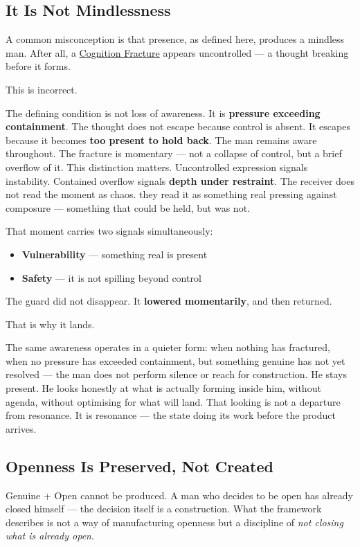 \subsection{It Is Not Mindlessness}

A common misconception is that presence, as defined here, produces a mindless man. After all, 
a \hyperref[cognition_fracture]{Cognition Fracture} appears uncontrolled --- a thought breaking before it forms.

This is incorrect.

The defining condition is not loss of awareness. It is \textbf{pressure exceeding containment}.
The thought does not escape because control is absent. It escapes because it becomes \textbf{too present to hold back}.
The man remains aware throughout. The fracture is momentary --- not a collapse of control, but a brief overflow of it.
This distinction matters.
Uncontrolled expression signals instability. Contained overflow signals \textbf{depth under restraint}.
The receiver does not read the moment as chaos. they read it as something real pressing against composure --- something 
that could be held, but was not.

That moment carries two signals simultaneously:
\begin{itemize}
    \item \textbf{Vulnerability} --- something real is present
    \item \textbf{Safety} --- it is not spilling beyond control
\end{itemize}

The guard did not disappear. It \textbf{lowered momentarily}, and then returned.

That is why it lands.

The same awareness operates in a quieter form: when nothing has fractured,
when no pressure has exceeded containment, but something genuine has not yet
resolved --- the man does not perform silence or reach for construction.
He stays present. He looks honestly at what is actually forming inside him,
without agenda, without optimising for what will land. That looking is not
a departure from resonance. It is resonance --- the state doing its work
before the product arrives.

\subsection{Openness Is Preserved, Not Created}

Genuine + Open cannot be produced. A man who decides to be open has already 
closed himself --- the decision itself is a construction. What the framework 
describes is not a way of manufacturing openness but a discipline of 
\textit{not closing what is already open}.


